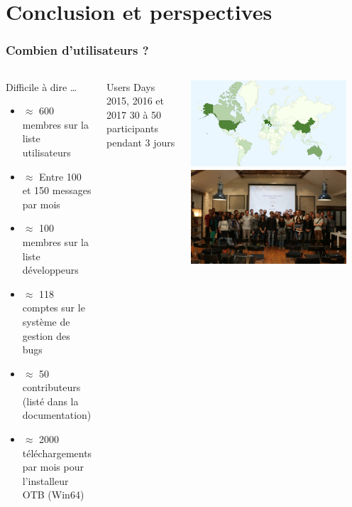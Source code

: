 \documentclass[8pt]{beamer}
\begin{document}
\section{Conclusion et perspectives}
\begin{frame}
\frametitle{Combien d'utilisateurs ?}
\begin{columns}[c]
\begin{block}{Difficile à dire \ldots}
\begin{itemize}
    \item $\approx$ 600 membres sur la liste utilisateurs
    \item $\approx$ Entre 100 et 150 messages par mois
    \item $\approx$ 100 membres sur la liste développeurs
    \item $\approx$ 118 comptes sur le système de gestion des bugs
    \item $\approx$ 50 contributeurs (listé dans la documentation)
    \item $\approx$ 2000 téléchargements par mois pour l'installeur OTB (Win64)
  \end{itemize}
\end{block}
\begin{block}{Users Days 2015, 2016 et 2017}
  30 à 50 participants pendant 3 jours
\end{block}
\includegraphics[width=0.9\textwidth]{images/OTB4_download_sourceforge_country_crop.png}\\
\includegraphics[width=0.9\textwidth]{images/userdays2017.jpg}
\end{columns}

\end{frame}
\end{document}
